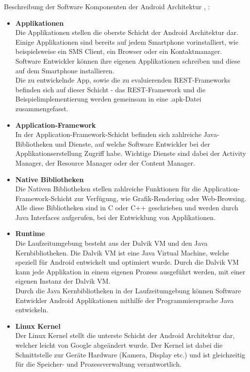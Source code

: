 Beschreibung der Software Komponenten der Android Architektur \cite{overviewAndroid:singh}, \cite{androidTutorialOS}: 
\begin{itemize}
	\item \textbf{Applikationen}\\
	Die Applikationen stellen die oberste Schicht der Android Architektur dar. Einige Applikationen sind bereits auf jedem Smartphone vorinstalliert, wie beispielsweise ein SMS Client,  ein Browser oder ein Kontaktmanager. Software Entwickler können ihre eigenen Applikationen schreiben und diese auf dem Smartphone installieren.\\
	Die zu entwickelnde App, sowie die zu evaluierenden REST-Frameworks befinden sich auf dieser Schicht - das REST-Framework und die Beispielimplementierung werden gemeinsam in eine .apk-Datei zusammengefasst.
	\item \textbf{Application-Framework}\\
    In der Application-Framework-Schicht befinden sich zahlreiche Java-Bibliotheken und Dienste, auf welche Software Entwickler bei der Applikationserstellung Zugriff habe. Wichtige Dienste sind dabei der Activity Manager, der Resource Manager oder der Content Manager.
	\item \textbf{Native Bibliotheken}\\
	Die Nativen Bibliotheken stellen zahlreiche Funktionen für die Application-Framework-Schicht zur Verfügung, wie Grafik-Rendering oder Web-Browsing. Alle diese Bibliotheken sind in C oder C++ geschrieben und werden durch Java Interfaces aufgerufen, bei der Entwicklung von Applikationen.
	\item \textbf{Runtime}\\
	Die Laufzeitumgebung besteht aus der Dalvik \acrfull{VM} und den Java Kernbibliotheken. Die Dalvik VM ist eine Java Virtual Machine, welche speziell für Android entwickelt und optimiert wurde.  Durch die  Dalvik VM kann jede Applikation in einem eigenen Prozess ausgeführt werden, mit einer eigenen Instanz der Dalvik VM. \\
	Durch die Java Kernbibliotheken in der Laufzeitumgebung können Software Entwickler Android Applikationen mithilfe der Programmiersprache Java entwickeln.   
	\item \textbf{Linux Kernel}\\
	Der Linux Kernel stellt die unterste Schicht der Android Architektur dar, welcher leicht von Google abgeändert wurde. Der Kernel ist dabei die Schnittstelle zur Geräte Hardware (Kamera, Display etc.) und ist gleichzeitig für die Speicher- und Prozessverwaltung verantwortlich.
\end{itemize}
	
